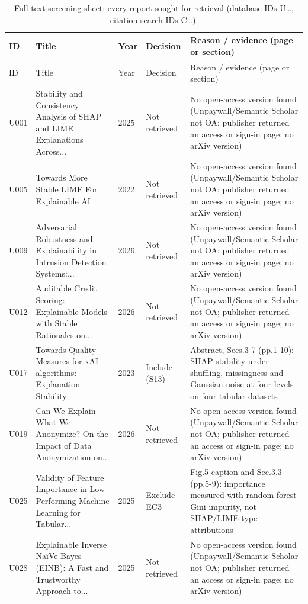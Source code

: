 \begin{longtable}{@{}P{1.0cm}P{6.3cm}P{0.7cm}P{1.6cm}P{6.1cm}@{}}
\caption{Full-text screening sheet: every report sought for retrieval (database IDs U\ldots, citation-search IDs C\ldots).}\label{tab:ftsheet}\\
\toprule ID & Title & Year & Decision & Reason / evidence (page or section) \\ \midrule \endfirsthead
\toprule ID & Title & Year & Decision & Reason / evidence (page or section) \\ \midrule \endhead
\bottomrule \endfoot
U001 & Stability and Consistency Analysis of SHAP and LIME Explanations Across... & 2025 & Not retrieved & No open-access version found (Unpaywall/\allowbreak{}Semantic Scholar not OA; publisher returned an access or sign-in page; no arXiv version) \\
U005 & Towards More Stable LIME For Explainable AI & 2022 & Not retrieved & No open-access version found (Unpaywall/\allowbreak{}Semantic Scholar not OA; publisher returned an access or sign-in page; no arXiv version) \\
U009 & Adversarial Robustness and Explainability in Intrusion Detection Systems:... & 2026 & Not retrieved & No open-access version found (Unpaywall/\allowbreak{}Semantic Scholar not OA; publisher returned an access or sign-in page; no arXiv version) \\
U012 & Auditable Credit Scoring: Explainable Models with Stable Rationales on... & 2026 & Not retrieved & No open-access version found (Unpaywall/\allowbreak{}Semantic Scholar not OA; publisher returned an access or sign-in page; no arXiv version) \\
U017 & Towards Quality Measures for xAI algorithms: Explanation Stability & 2023 & Include (S13) & Abstract, Secs.3-7 (pp.1-10): SHAP stability under shuffling, missingness and Gaussian noise at four levels on four tabular datasets \\
U019 & Can We Explain What We Anonymize? On the Impact of Data Anonymization on... & 2026 & Not retrieved & No open-access version found (Unpaywall/\allowbreak{}Semantic Scholar not OA; publisher returned an access or sign-in page; no arXiv version) \\
U025 & Validity of Feature Importance in Low-Performing Machine Learning for Tabular... & 2025 & Exclude EC3 & Fig.5 caption and Sec.3.3 (pp.5-9): importance measured with random-forest Gini impurity, not SHAP/\allowbreak{}LIME-type attributions \\
U028 & Explainable Inverse NaïVe Bayes (EINB): A Fast and Trustworthy Approach to... & 2025 & Not retrieved & No open-access version found (Unpaywall/\allowbreak{}Semantic Scholar not OA; publisher returned an access or sign-in page; no arXiv version) \\

\end{longtable}
